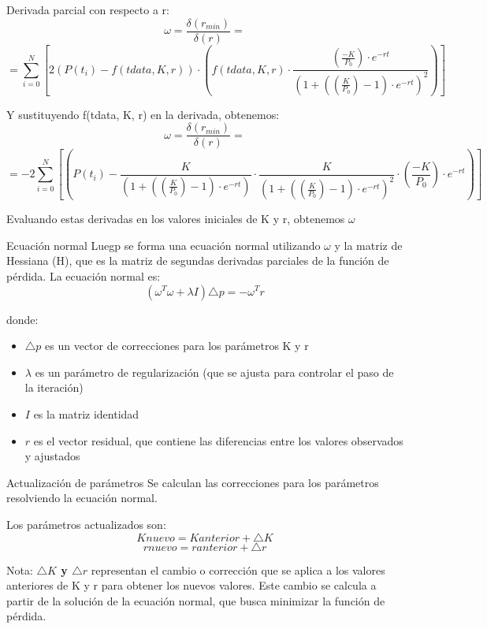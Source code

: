 \documentclass{beamer}
\begin{document}
\begin{frame}  
\begin{block}{Derivada parcial con respecto a r:}
$$\omega = \frac{\delta(r_{min})}{\delta(r)} = $$ 
\small{$$=\sum_{i=0}^{N}[2(P(t_{i}) - f(tdata, K, r)) \cdot (f(tdata, K, r) \cdot \frac{(\frac{-K}{P_{0}}) \cdot e^{-rt}}{(1 + ((\frac{K}{P_{0}}) - 1) \cdot e^{-rt})^{2}})]$$}
\end{block}
\begin{block}{Y sustituyendo  f(tdata, K, r) en la derivada, obtenemos:}
$$\omega = \frac{\delta(r_{min})}{\delta(r)} = $$
\small{$$= -2\sum_{i=0}^{N}[(P(t_{i}) - \frac{K}{(1 + ((\frac{K}{P_{0}}) - 1) \cdot e^{-rt})} \cdot \frac{K}{(1 + ((\frac{K}{P_{0}}) - 1) \cdot e^{-rt})^{2}} \cdot (\frac{-K}{P_{0}}) \cdot e^{-rt})]$$}
\end{block}
Evaluando estas derivadas en los valores iniciales de K y r, obtenemos $\omega$
\end{frame}

\begin{frame}{Ecuación normal}
    Luegp se forma una ecuación normal utilizando $\omega$ y la matriz de Hessiana (H), que es la matriz de segundas derivadas parciales de la función de pérdida. La ecuación normal es:
    $$(\omega^{T}\omega + \lambda I)\triangle p = -\omega^{T} r$$
    \begin{block}{donde:}
        \begin{itemize}
            \item $\triangle p$ es un vector de correcciones para los parámetros K y r
            \item $\lambda$ es un parámetro de regularización (que se ajusta para controlar el paso de la iteración)
            \item $I$ es la matriz identidad
            \item $r$ es el vector residual, que contiene las diferencias entre los valores observados y ajustados
        \end{itemize}
    \end{block}
\end{frame}

\begin{frame}{Actualización de parámetros}
Se calculan las correcciones para los parámetros resolviendo la ecuación normal. 
\begin{block}{Los parámetros actualizados son:}
$$Knuevo = Kanterior + \triangle K$$
$$rnuevo = ranterior + \triangle r$$
\end{block}
Nota: \textbf{$\triangle K$ y $\triangle r$} representan el cambio o corrección que se aplica a los valores anteriores de K y r para obtener los nuevos valores. Este cambio se calcula a partir de la solución de la ecuación normal, que busca minimizar la función de pérdida.
\end{frame}
\end{document}
